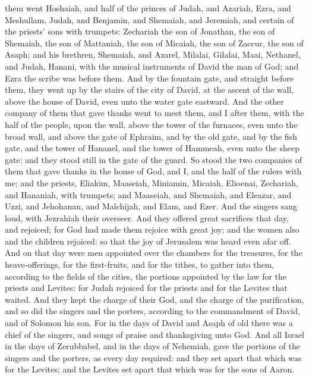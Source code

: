 them went Hoshaiah, and half of the princes of Judah, and Azariah, Ezra, and Meshullam, Judah, and Benjamin, and Shemaiah, and Jeremiah, and certain of the priests’ sons with trumpets: Zechariah the son of Jonathan, the son of Shemaiah, the son of Mattaniah, the son of Micaiah, the son of Zaccur, the son of Asaph; and his brethren, Shemaiah, and Azarel, Milalai, Gilalai, Maai, Nethanel, and Judah, Hanani, with the musical instruments of David the man of God; and Ezra the scribe was before them. And by the fountain gate, and straight before them, they went up by the stairs of the city of David, at the ascent of the wall, above the house of David, even unto the water gate eastward.  And the other company of them that gave thanks went to meet them, and I after them, with the half of the people, upon the wall, above the tower of the furnaces, even unto the broad wall, and above the gate of Ephraim, and by the old gate, and by the fish gate, and the tower of Hananel, and the tower of Hammeah, even unto the sheep gate: and they stood still in the gate of the guard. So stood the two companies of them that gave thanks in the house of God, and I, and the half of the rulers with me; and the priests, Eliakim, Maaseiah, Miniamin, Micaiah, Elioenai, Zechariah, and Hananiah, with trumpets; and Maaseiah, and Shemaiah, and Eleazar, and Uzzi, and Jehohanan, and Malchijah, and Elam, and Ezer. And the singers sang loud, with Jezrahiah their overseer. And they offered great sacrifices that day, and rejoiced; for God had made them rejoice with great joy; and the women also and the children rejoiced: so that the joy of Jerusalem was heard even afar off.  And on that day were men appointed over the chambers for the treasures, for the heave-offerings, for the first-fruits, and for the tithes, to gather into them, according to the fields of the cities, the portions appointed by the law for the priests and Levites: for Judah rejoiced for the priests and for the Levites that waited. And they kept the charge of their God, and the charge of the purification, and so did the singers and the porters, according to the commandment of David, and of Solomon his son. For in the days of David and Asaph of old there was a chief of the singers, and songs of praise and thanksgiving unto God. And all Israel in the days of Zerubbabel, and in the days of Nehemiah, gave the portions of the singers and the porters, as every day required: and they set apart that which was for the Levites; and the Levites set apart that which was for the sons of Aaron. 

